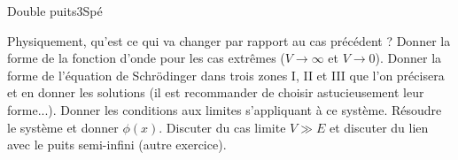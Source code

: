 \begin{exercise}{Double puits}{3}{Spé}
\begin{questions}
\begin{center}
\begin{tikzpicture}
    \end{tikzpicture}
\end{center}
    \question Physiquement, qu'est ce qui va changer par rapport au cas précédent ? Donner la forme de la fonction d'onde pour les cas extrêmes ($V \rightarrow \infty$ et $V\rightarrow 0$).
    \question Donner la forme de l'équation de Schrödinger dans trois zones I, II et III que l'on précisera et en donner les solutions (il est recommander de choisir astucieusement leur forme...).
    \question Donner les conditions aux limites s'appliquant à ce système.
    \question Résoudre le système et donner $\phi(x)$.
    \question Discuter du cas limite $V \gg E$ et discuter du lien avec le puits semi-infini (autre exercice).

\end{questions}

\end{exercise}